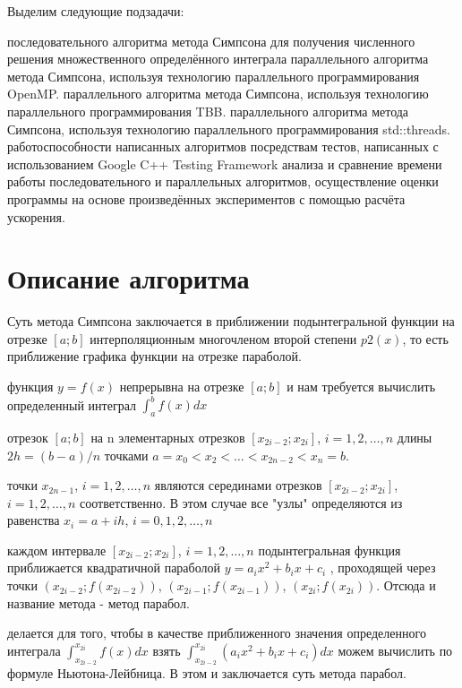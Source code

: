 \documentclass{report}
\begin{document}
Выделим следующие подзадачи:
\begin{enumerate} 
 последовательного алгоритма метода Симпсона для получения численного решения множественного определённого интеграла
 параллельного алгоритма метода Симпсона, используя технологию параллельного программирования OpenMP.
 параллельного алгоритма метода Симпсона, используя технологию параллельного программирования TBB.
 параллельного алгоритма метода Симпсона, используя технологию параллельного программирования std::threads.
 работоспособности написанных алгоритмов посредствам тестов, написанных с использованием Google C++ Testing Framework
 анализа и сравнение времени работы последовательного и параллельных алгоритмов, осуществление оценки программы на основе произведённых экспериментов с помощью расчёта ускорения.
\end{enumerate} 

\newpage

\section*{Описание алгоритма}
Суть метода Симпсона заключается в приближении подынтегральной функции на отрезке $[a; b]$ интерполяционным многочленом второй степени $p2(x)$, то есть приближение графика функции на отрезке параболой.

 функция $y = f(x)$ непрерывна на отрезке $[a; b]$ и нам требуется вычислить определенный интеграл $\int_{a}^{b} f(x)dx$ 

 отрезок $[a; b]$ на n элементарных отрезков $[x_{2i-2}; x_{2i}]$, $ i = 1, 2, \ldots, n$ длины $ 2h = (b - a)/n$ точками $ a = x_0 < x_2 < … < x_{2n-2} < x_n = b $.

 точки $x_{2n-1}$, $ i = 1, 2, \ldots, n$ являются серединами отрезков $[x_{2i-2}; x_{2i}]$, $ i = 1, 2, \ldots, n$ соответственно.
В этом случае все "узлы" определяются из равенства $x_i = a + ih$, $i = 0, 1, 2,\ldots, n$

 каждом интервале $[x_{2i-2}; x_{2i}]$, $i = 1, 2, \ldots, n$ подынтегральная функция приближается квадратичной параболой $y = a_i x^2 + b_i x + c_i$ , проходящей через точки $(x_{2i-2};f(x_{2i-2}))$, $(x_{2i-1};f(x_{2i-1}))$, $(x_{2i};f(x_{2i}))$. Отсюда и название метода - метод парабол.

 делается для того, чтобы в качестве приближенного значения определенного интеграла $\int_{x_{2i-2}}^{x_{2i}}f(x)dx$ взять $\int_{x_{2i-2}}^{x_{2i}}(a_i x^2 + b_i x + c_i) dx$ можем вычислить по формуле Ньютона-Лейбница. В этом и заключается суть метода парабол.
\end{document}
